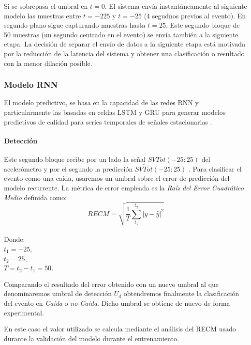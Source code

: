 Si se sobrepasa el umbral en $t=0$. El sistema envía instantáneamente al siguiente modelo las muestras entre $t=-225$ y $t=-25$ (4 segudnos previos al evento). En segundo plano sigue capturando muestras hasta $t=25$. Este segundo bloque de 50 muestras (un segundo centrado en el evento) se envía también a la siguiente etapa. La decisión de separar el envío de datos a la siguiente etapa está motivada por la reducción de la latencia del sistema y obtener una clasificación o resultado con la menor dilación posible.


\subsubsection{Modelo RNN}


El modelo predictivo, se basa en la capacidad de las redes RNN y particularmente las basadas en celdas LSTM y GRU para generar modelos predictivos de calidad para series temporales de señales estacionarias \cite{Qin2019}.



\paragraph*{Detección}

Este segundo bloque recibe por un lado la señal $SVTot(-25:25)$ del acelerómetro y por el segundo la predicción $\hat{SVTot}(-25:25)$ . Para clasificar el evento como una caída, usaremos un umbral sobre el error de predicción del modelo recurrente. La métrica de error empleada es la \textit{Raíz del Error Cuadrático Medio} definida como: \[
  RECM=\sqrt{\frac{1}{T}\sum_{t_1}^{t_2}|y-\hat{y}|^2 }
\]\\
Donde:\\
$t_1 = -25$,\\
$t_2 = 25$,\\
$T=t_2-t_1=50$.

Comparando el resultado del error obtenido con un nuevo umbral al que denominaremos umbral de detección $U_{d}$ obtendremos finalmente la clasificación del evento en \textit{Caída} o \textit{no-Caida}. Dicho umbral se obtiene de nuevo de forma experimental.

En este caso el valor utilizado se calcula mediante el análisis del RECM usado durante la validación del modelo durante el entrenamiento. 

